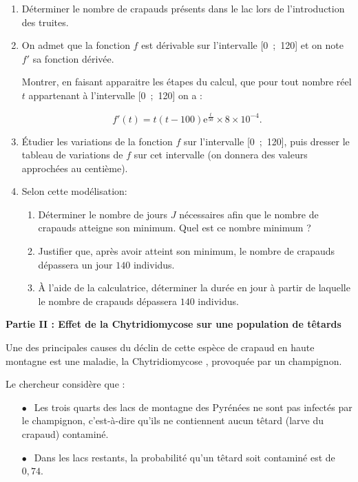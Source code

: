 \documentclass[11pt]{article}
\begin{document}
\begin{enumerate}
\item Déterminer le nombre de crapauds présents dans le lac lors de l'introduction des truites.
\item On admet que la fonction $f$ est dérivable sur l'intervalle [0~;~120] et on note $f'$ sa fonction dérivée.

Montrer, en faisant apparaitre les étapes du calcul, que pour tout nombre réel $t$ appartenant à 
l'intervalle [0~;~120] on a : 

\[f'(t) = t(t - 100)\text{e}^{\frac{t}{50}} \times 8 \times 10^{-4}.\]

\item Étudier les variations de la fonction $f$ sur l'intervalle [0~;~120], puis dresser le tableau de variations de $f$ sur cet intervalle (on donnera des valeurs approchées au centième).
\item Selon cette modélisation:
	\begin{enumerate}
		\item Déterminer le nombre de jours $J$ nécessaires afin que le nombre de crapauds atteigne son minimum. Quel est ce nombre minimum ?
		\item Justifier que, après avoir atteint son minimum, le nombre de crapauds dépassera un jour $140$ individus.
		\item À l'aide de la calculatrice, déterminer la durée en jour à partir de laquelle le nombre de crapauds dépassera $140$ individus.
	\end{enumerate}
\end{enumerate}

\begin{center}\textbf{Partie II : Effet de la Chytridiomycose sur une population de têtards}\end{center}

Une des principales causes du déclin de cette espèce de crapaud en haute montagne est une maladie, la \og Chytridiomycose \fg, provoquée par un champignon.

Le chercheur considère que :

\begin{itemize}
\item[$\bullet~~$]Les trois quarts des lacs de montagne des Pyrénées ne sont pas infectés par le champignon, c'est-à-dire qu'ils ne contiennent aucun têtard (larve du crapaud) contaminé.
\item[$\bullet~~$]Dans les lacs restants, la probabilité qu'un têtard soit contaminé est de $0,74$.
\end{itemize}
\end{document}

